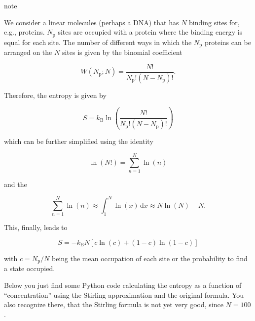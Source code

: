 \documentclass[letterpaper,10pt,english]{sphinxmanual}
\let\sphinxpxdimen\pdfpxdimen\else\newdimen\sphinxpxdimen
\begin{document}
\begin{sphinxadmonition}{note}{}\unskip
\sphinxAtStartPar
{}

\noindent\sphinxincludegraphics[width=400\sphinxpxdimen,height=73\sphinxpxdimen]{{binding}.png}

\sphinxAtStartPar
We consider a linear molecules (perhaps a DNA) that has \(N\) binding sites for, e.g., proteins. \(N_\mathrm{p}\) sites are occupied with a protein where the binding energy is equal for each site. The number of different ways in which the \(N_\mathrm{p}\) proteins can be arranged on the \(N\) sites is given by the binomial coefficient

\sphinxAtStartPar
\begin{equation}
W(N_\mathrm{p};N)=\frac{N!}{N_\mathrm{p}!(N-N_\mathrm{p})!}.
\end{equation}

\sphinxAtStartPar
Therefore, the entropy is given by

\sphinxAtStartPar
\begin{equation}
S=k_\mathrm{B} \ln\left ( \frac{N!}{N_\mathrm{p}!(N-N_\mathrm{p})!}\right )
\end{equation}

\sphinxAtStartPar
which can be further simplified using the identity

\sphinxAtStartPar
\begin{equation}
\ln(N!)=\sum_{n=1}^{N}\ln(n)
\end{equation}

\sphinxAtStartPar
and the 

\sphinxAtStartPar
\begin{equation}
\sum_{n=1}^{N}\ln(n)\approx \int_1^{N}\ln(x)\,\mathrm{d}x\approx N\ln(N)-N.
\end{equation}

\sphinxAtStartPar
This, finally, leads to

\sphinxAtStartPar
\begin{equation}
S=-k_\mathrm{B} N [c \ln(c)+(1-c)\ln(1-c)]
\end{equation}

\sphinxAtStartPar
with \(c=N_\mathrm{p}/N\) being the mean occupation of each site or the probability to find a state occupied.
\end{sphinxadmonition}

\sphinxAtStartPar
Below you just find some Python code calculating the entropy as a function of “concentration” using the Stirling approximation and the original formula. You also recognize there, that the Stirling formula is not yet very good, since \(N=100\).
\end{document}
